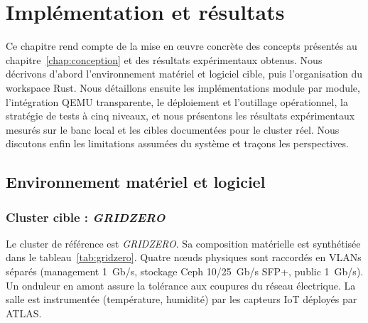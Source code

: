 \chapter{Implémentation et résultats}
\label{chap:implementation}


Ce chapitre rend compte de la mise en œuvre concrète des concepts présentés au chapitre~\ref{chap:conception} et des résultats expérimentaux obtenus. Nous décrivons d'abord l'environnement matériel et logiciel cible, puis l'organisation du workspace Rust. Nous détaillons ensuite les implémentations module par module, l'intégration QEMU transparente, le déploiement et l'outillage opérationnel, la stratégie de tests à cinq niveaux, et nous présentons les résultats expérimentaux mesurés sur le banc local et les cibles documentées pour le cluster réel. Nous discutons enfin les limitations assumées du système et traçons les perspectives.

\section{Environnement matériel et logiciel}
\label{sec:env}

\subsection{Cluster cible : \emph{GRIDZERO}}

Le cluster de référence est \emph{GRIDZERO}. Sa composition matérielle est synthétisée dans le tableau~\ref{tab:gridzero}. Quatre nœuds physiques sont raccordés en VLANs séparés (management 1~Gb/s, stockage Ceph 10/25~Gb/s SFP+, public 1~Gb/s). Un onduleur en amont assure la tolérance aux coupures du réseau électrique. La salle est instrumentée (température, humidité) par les capteurs IoT déployés par ATLAS.

